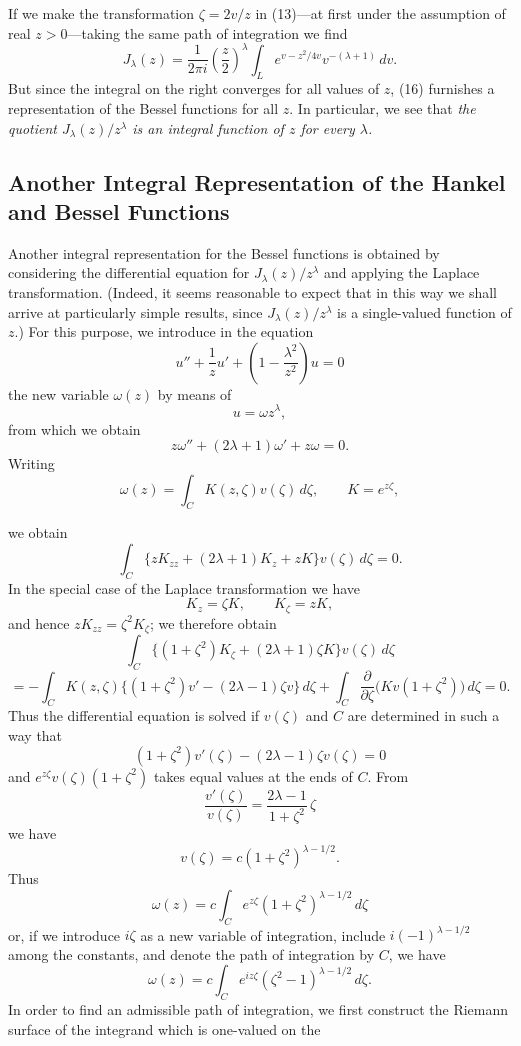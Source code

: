 If we make the transformation $\zeta=2v/z$ in (13)---at first under the assumption of real $z>0$---taking the same path of integration we find
\begin{equation}\tag{16}
J_\lambda(z)=\frac1{2\pi i}\left(\frac z2\right)^\lambda\int_L e^{v-z^2/4v}v^{-(\lambda+1)}\,dv.
\end{equation}
But since the integral on the right converges for all values of $z$, (16) furnishes a representation of the Bessel functions for all $z$. In particular, we see that \emph{the quotient $J_\lambda(z)/z^\lambda$ is an integral function of $z$ for every $\lambda$.}

\subsection{Another Integral Representation of the Hankel and Bessel Functions}
Another integral representation for the Bessel functions is obtained by considering the differential equation for $J_\lambda(z)/z^\lambda$ and applying the Laplace transformation. (Indeed, it seems reasonable to expect that in this way we shall arrive at particularly simple results, since $J_\lambda(z)/z^\lambda$ is a single-valued function of $z$.) For this purpose, we introduce in the equation
\[
u''+\frac1zu'+\left(1-\frac{\lambda^2}{z^2}\right)u=0
\]
the new variable $\omega(z)$ by means of
\[
u=\omega z^\lambda,
\]
from which we obtain
\begin{equation}\tag{17}
z\omega''+(2\lambda+1)\omega'+z\omega=0.
\end{equation}
Writing
\[
\omega(z)=\int_CK(z,\zeta)v(\zeta)\,d\zeta,\qquad K=e^{z\zeta},
\]

we obtain
\[
\int_C\{zK_{zz}+(2\lambda+1)K_z+zK\}v(\zeta)\,d\zeta=0.
\]
In the special case of the Laplace transformation we have
\[
K_z=\zeta K,
\qquad
K_\zeta=zK,
\]
and hence $zK_{zz}=\zeta^2K_\zeta$; we therefore obtain
\[
\int_C\{(1+\zeta^2)K_\zeta+(2\lambda+1)\zeta K\}v(\zeta)\,d\zeta
\]
\[
=-\int_C K(z,\zeta)\{(1+\zeta^2)v'-(2\lambda-1)\zeta v\}\,d\zeta
+\int_C\frac{\partial}{\partial\zeta}\bigl(Kv(1+\zeta^2)\bigr)\,d\zeta=0.
\]
Thus the differential equation is solved if $v(\zeta)$ and $C$ are determined in such a way that
\[
(1+\zeta^2)v'(\zeta)-(2\lambda-1)\zeta v(\zeta)=0
\]
and $e^{z\zeta}v(\zeta)(1+\zeta^2)$ takes equal values at the ends of $C$. From
\[
\frac{v'(\zeta)}{v(\zeta)}=\frac{2\lambda-1}{1+\zeta^2}\,\zeta
\]
we have
\[
v(\zeta)=c(1+\zeta^2)^{\lambda-1/2}.
\]
Thus
\[
\omega(z)=c\int_C e^{z\zeta}(1+\zeta^2)^{\lambda-1/2}\,d\zeta
\]
or, if we introduce $i\zeta$ as a new variable of integration, include $i(-1)^{\lambda-1/2}$ among the constants, and denote the path of integration by $C$, we have
\[
\omega(z)=c\int_C e^{iz\zeta}(\zeta^2-1)^{\lambda-1/2}\,d\zeta.
\]
In order to find an admissible path of integration, we first construct the Riemann surface of the integrand which is one-valued on the

